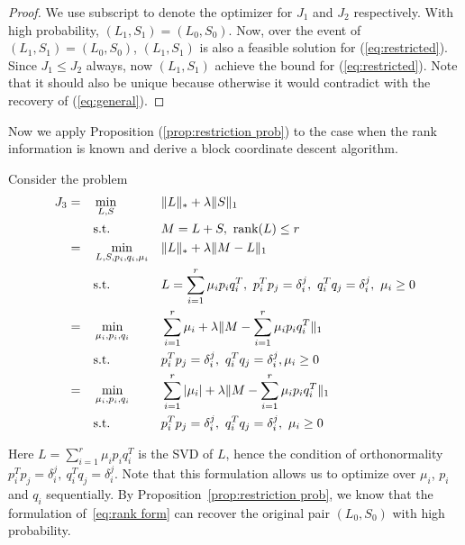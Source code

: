 \begin{proof}
We use subscript to denote the optimizer for $J_{1}$ and $J_{2}$ respectively.
With high probability, $(L_{1},S_{1})=(L_{0},S_{0})$. Now, over the event of $(L_{1},S_{1})=(L_{0},S_{0})$, $(L_{1},S_{1})$ is also a feasible solution for (\ref{eq:restricted}). Since $J_{1}\le J_{2}$ always, now $(L_{1},S_{1})$ achieve the bound for (\ref{eq:restricted}).
Note that it should also be unique because otherwise it would contradict with the recovery of (\ref{eq:general}).
\end{proof}

Now we apply Proposition (\ref{prop:restriction prob}) to the case when the rank information is known and derive a block coordinate descent algorithm.

Consider the problem
\begin{alignat}{3}
J_{3}
&= &&\min_{L, S}  && \|L\|_{*} + \lambda \|S\|_{1} \notag \\
&&&\text{s.t.} && M=L+S, \ \text{rank}(L)\le r \notag \\
&= &&\min_{L, S, p_i, q_i, \mu_i} && \|L\|_{*} + \lambda\| M - L \|_{1} \notag \\
&&& \text{s.t.} && L = \sum_{i=1}^{r} \mu_{i}p_{i}q_{i}^{T}, \  p_i^Tp_j = \delta_i^j, \ q_{i}^Tq_j = \delta_i^j, \ \mu_{i}\ge0 \notag \\
&= && \min_{\mu_{i}, p_{i}, q_{i}} && \sum_{i=1}^{r} \mu_{i} + \lambda \|M - \sum_{i=1}^{r} \mu_{i}p_{i}q_{i}^{T}\|_{1} \notag \\
&&& \text{s.t.} && p_i^Tp_j = \delta_i^j, \ q_{i}^Tq_j = \delta_i^j, \mu_{i} \ge 0 \notag \\
& = && \min_{\mu_{i}, p_{i}, q_{i}} && \sum_{i=1}^{r} |\mu_{i}| + \lambda \|M - \sum_{i=1}^{r} \mu_{i} p_{i} q_{i}^{T}\|_{1} \label{eq:rank form} \\
&&& \text{s.t.} && p_i^Tp_j = \delta_i^j, \ q_{i}^Tq_j = \delta_i^j, \ \mu_{i} \ge 0 \notag
\end{alignat}

Here $L = \sum_{i=1}^{r} \mu_{i}p_{i}q_{i}^{T}$ is the SVD of $L$, hence the condition of orthonormality $p_i^Tp_j = \delta_i^j, \ q_{i}^Tq_j = \delta_i^j$. Note that this formulation allows us to optimize over $\mu_{i}$, $p_{i}$ and $q_{i}$ sequentially. By Proposition~\ref{prop:restriction prob}, we know that the formulation of~\eqref{eq:rank form} can recover the original pair $(L_{0},S_{0})$ with high probability.


